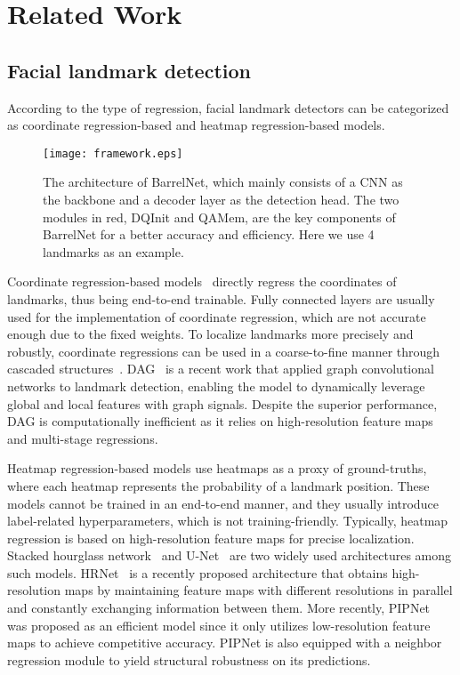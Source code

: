 \documentclass{article}
\begin{document}
\section{Related Work}
\label{sec:2}



\subsection{Facial landmark detection}

According to the type of regression, facial landmark detectors can be categorized as coordinate regression-based and heatmap regression-based models. 

\begin{figure}
\centering
  \texttt{[image: framework.eps]}
\vspace{-1mm}
\caption{The architecture of BarrelNet, which mainly consists of a CNN as the backbone and a decoder layer as the detection head. The two modules in red, DQInit and QAMem, are the key components of BarrelNet for a better accuracy and efficiency. Here we use 4 landmarks as an example.}
\label{fig:framework}      
\end{figure}

Coordinate regression-based models~\citep{WQY18,ZSZ19,VBV18,LZH19} directly regress the coordinates of landmarks, thus being end-to-end trainable. Fully connected layers are usually used for the implementation of coordinate regression, which are not accurate enough due to the fixed weights. To localize landmarks more precisely and robustly, coordinate regressions can be used in a coarse-to-fine manner through cascaded structures~\citep{SWT13,ZLL15,TSN16,LSX17,FKA18}. DAG~\citep{LLZ20} is a recent work that applied graph convolutional networks to landmark detection, enabling the model to dynamically leverage global and local features with graph signals. Despite the superior performance, DAG is computationally inefficient as it relies on high-resolution feature maps and multi-stage regressions. 

Heatmap regression-based models use heatmaps as a proxy of ground-truths, where each heatmap represents the probability of a landmark position. These models cannot be trained in an end-to-end manner, and they usually introduce label-related hyperparameters, which is not training-friendly. Typically, heatmap regression is based on high-resolution feature maps for precise localization. Stacked hourglass network~\citep{NYD16,YLZ17,LZH19,CSJ19,DoY19,ZZY19,WBF19,CBG20} and U-Net~\citep{RFB15,TPG18,ZZY19,DBC19,KMM20} are two widely used architectures among such models. HRNet~\citep{WSC19} is a recently proposed architecture that obtains high-resolution maps by maintaining feature maps with different resolutions in parallel and constantly exchanging information between them. More recently, PIPNet~\citep{JLS20} was proposed as an efficient model since it only utilizes low-resolution feature maps to achieve competitive accuracy. PIPNet is also equipped with a neighbor regression module to yield structural robustness on its predictions. 
\end{document}
